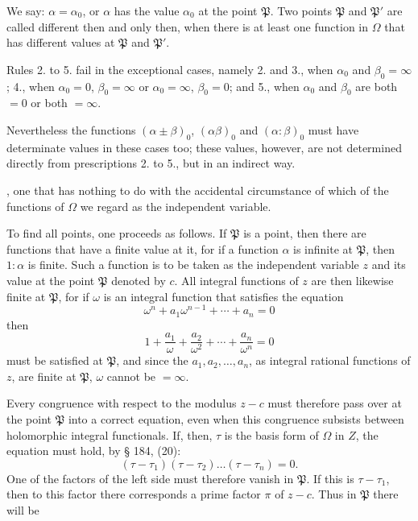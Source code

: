  We say: $\alpha = \alpha_0$, or $\alpha$ has the value $\alpha_0$
at the point $\mathfrak{P}$. Two points $\mathfrak{P}$ and $\mathfrak{P}'$ are called different then and only
then, when there is at least one function in $\Omega$ that has
different values at $\mathfrak{P}$ and $\mathfrak{P}'$.

Rules 2. to 5. fail in the exceptional cases, namely
2. and 3., when $\alpha_0$ and $\beta_0 = \infty$; 4., when $\alpha_0 = 0$, $\beta_0 = \infty$
or $\alpha_0 = \infty$, $\beta_0 = 0$; and 5., when $\alpha_0$ and $\beta_0$ are both $= 0$
or both $= \infty$.

Nevertheless the functions $(\alpha \pm \beta)_0$, $(\alpha\beta)_0$ and $(\alpha : \beta)_0$
must have determinate values in these cases too; these values, however, are not
 determined directly from prescriptions 2. to 5., but in an indirect
way.

, one that has nothing to do with the accidental
circumstance of which of the functions of $\Omega$ we regard as the
independent variable.

To find all points, one proceeds as follows. If $\mathfrak{P}$ is a point,
then there are functions that have a finite value at it,
for if a function $\alpha$ is infinite at $\mathfrak{P}$, then $1 : \alpha$ is finite.
Such a function is to be taken as the independent variable $z$
and its value at the point $\mathfrak{P}$ denoted by $c$. All integral functions
 of $z$ are then likewise finite at $\mathfrak{P}$, for if $\omega$ is an
integral function that satisfies the equation
\[
\omega^{n} + a_1\omega^{n-1} + \cdots + a_n = 0
\]
then
\[
1 + \frac{a_1}{\omega} + \frac{a_2}{\omega^2} + \cdots + \frac{a_n}{\omega^n} = 0
\]
must be satisfied at $\mathfrak{P}$, and since the $a_1, a_2, \dots, a_n$, as integral rational
functions of $z$, are finite at $\mathfrak{P}$, $\omega$ cannot be $= \infty$.

Every congruence with respect to the modulus $z - c$ must therefore pass over at the
point $\mathfrak{P}$ into a correct equation, even when this
congruence subsists between holomorphic integral functionals.
If, then, $\tau$ is the basis form of $\Omega$ in $Z$, the
equation must hold, by § 184, (20):
\[
(\tau - \tau_1)(\tau - \tau_2)\dots(\tau - \tau_n) = 0.
\]
One of the factors of the left side must therefore vanish in $\mathfrak{P}$.
If this is $\tau - \tau_1$, then to this factor there corresponds a
prime factor $\pi$ of $z - c$. Thus in $\mathfrak{P}$ there will be

